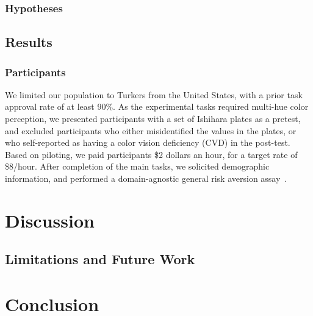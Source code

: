 \documentclass{vgtc}                          %
\begin{document}

\subsubsection{Hypotheses}

\subsection{Results}
\subsubsection{Participants}

We limited our population to Turkers from the United States, with a prior task approval rate of at least 90\%. As the experimental tasks required multi-hue color perception, we presented participants with a set of Ishihara plates as a pretest, and excluded participants who either misidentified the values in the plates, or who self-reported as having a color vision deficiency (CVD) in the post-test. Based on piloting, we paid participants \$2 dollars an hour, for a target rate of \$8/hour. After completion of the main tasks, we solicited demographic information, and performed a domain-agnostic general risk aversion assay~\cite{mandrik2005exploring}.

\section{Discussion}
\subsection{Limitations and Future Work}

\section{Conclusion}



%

%
%
%


\end{document}
